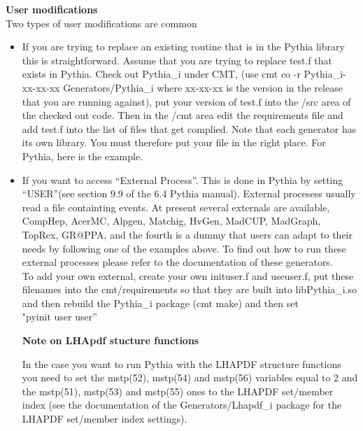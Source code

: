 \documentclass[11pt]{article}
\begin{document}
 {\large \bf User modifications}\\

Two types of user modifications are common

\begin{itemize}
\item If you are trying to replace an existing routine that is in the
  Pythia library this is straightforward.
Assume that you are trying to replace test.f that exists in Pythia.
Check out Pythia\_i under CMT,  (use cmt co -r Pythia\_i-xx-xx-xx  Generators/Pythia\_i where
xx-xx-xx is the version in the release that you are running against), put your version of test.f into the /src area of the checked out
code. Then in the /cmt area edit the requirements file and add test.f
into the list of files that get complied. Note that each generator has
its own library. You must therefore put your file in the right
place. For Pythia, here is the example.
\item If you want to access ``External Process''. This is done in
  Pythia by setting ``USER''(see section 9.9 of the 6.4 Pythia
  manual). External procesess usually read a file containting events.  At present several externals are available,
  CompHep, AcerMC, Alpgen, Matchig, HvGen, MadCUP, MadGraph, TopRex, GR@PPA,
  and the fourth is a dummy that users can adapt to their
  needs by following one of the examples above. To find out how to run these external processes
  please refer to the documentation of these generators. \\
  To add your own external, create your own  inituser.f and useuser.f,
  put these filenames into the cmt/requirements so that they are built
  into libPythia\_i.so and then rebuild the Pythia\_i  package  (cmt make) and then
  set\\ 
  "pyinit user user''

{\large \bf Note on LHApdf stucture functions}

In the case you want to run Pythia with the LHAPDF structure functions you need to
set the mstp(52), mstp(54) and mstp(56) variables equal to 2 and the mstp(51),
mstp(53) and mstp(55) ones to the LHAPDF set/member index (see the documentation
of the Generators/Lhapdf\_i package for the LHAPDF set/member index settings).

\end{itemize}
\end{document}
